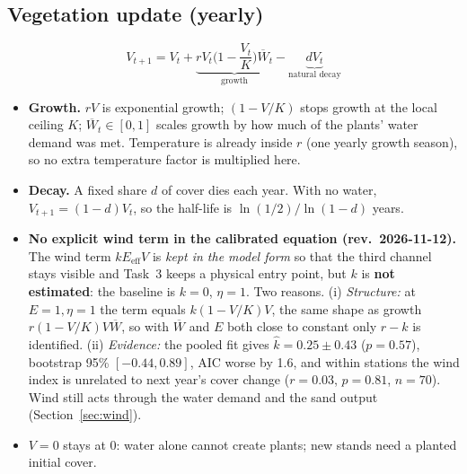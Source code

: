 \documentclass[11pt,a4paper]{article}
\newcommand{\Wb}{\overline W}
\begin{document}
\subsection{Vegetation update (yearly)}
\begin{equation}\label{eq:veg}
V_{t+1}=V_t+\underbrace{rV_t\Big(1-\frac{V_t}{K}\Big)\Wb_t}_{\text{growth}}
-\underbrace{dV_t}_{\text{natural decay}}
\end{equation}
\begin{itemize}
\item \textbf{Growth.} $rV$ is exponential growth; $(1-V/K)$ stops growth at the local ceiling $K$;
$\Wb_t\in[0,1]$ scales growth by how much of the plants' water demand was met. Temperature is
already inside $r$ (one yearly growth season), so no extra temperature factor is multiplied here.
\item \textbf{Decay.} A fixed share $d$ of cover dies each year. With no water,
$V_{t+1}=(1-d)V_t$, so the half-life is $\ln(1/2)/\ln(1-d)$ years.
\item \textbf{No explicit wind term in the calibrated equation (rev.\ 2026-11-12).}
The wind term $kE_{\mathrm{eff}}V$ is \emph{kept in the model form} so that the third channel stays visible and
Task~3 keeps a physical entry point, but $k$ is \textbf{not estimated}: the baseline is $k=0$, $\eta=1$.
Two reasons. (i) \emph{Structure:} at $E=1,\eta=1$ the term equals $k(1-V/K)V$, the same shape as growth
$r(1-V/K)V\Wb$, so with $\Wb$ and $E$ both close to constant only $r-k$ is identified.
(ii) \emph{Evidence:} the pooled fit gives $\hat k=0.25\pm0.43$ ($p=0.57$), bootstrap 95\% $[-0.44,0.89]$,
AIC worse by 1.6, and within stations the wind index is unrelated to next year's cover change
($r=0.03$, $p=0.81$, $n=70$). Wind still acts through the water demand and the sand output (Section~\ref{sec:wind}).
\item $V=0$ stays at 0: water alone cannot create plants; new stands need a planted initial cover.
\end{itemize}
\end{document}
